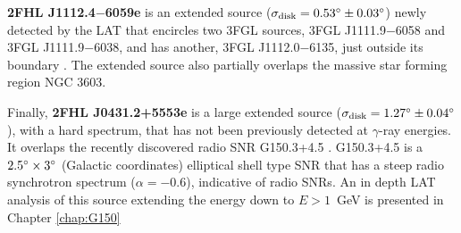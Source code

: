 {\bfseries 2FHL J1112.4$-$6059e} is an extended source (${\rm \sigma_{disk} =  0.53^{\circ} \pm 0.03^{\circ}}$) newly detected by the LAT that encircles two 3FGL sources, 3FGL J1111.9$-$6058 and 3FGL J1111.9$-$6038, and has another, 3FGL J1112.0$-$6135, just outside its boundary \citep{3FGL}. The extended source also partially overlaps the massive star forming region NGC 3603. %

Finally, {\bfseries 2FHL J0431.2+5553e} is a large extended source (${\rm \sigma_{disk} =  1.27^{\circ} \pm 0.04^{\circ}}$), with { a hard spectrum}, that has not been previously detected at $\gamma$-ray energies. It overlaps the recently discovered radio SNR G150.3+4.5 \citep{Gao14}. G150.3+4.5 is a ${\rm 2.5^{\circ}}\times {\rm 3^{\circ}}$ (Galactic coordinates)
elliptical shell type SNR that has a steep radio synchrotron spectrum ($\alpha = -0.6$), indicative of radio SNRs. An in depth LAT analysis of this source extending the energy down to $E > 1$~GeV is presented in Chapter \ref{chap:G150}

